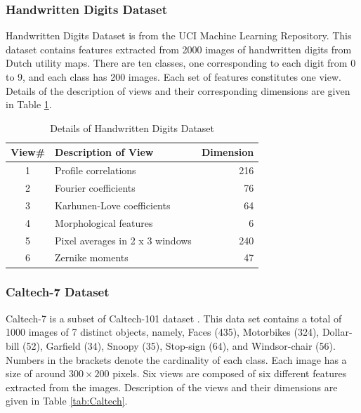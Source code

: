 \subsubsection{Handwritten Digits Dataset}
\hspace{0.8cm}Handwritten Digits Dataset \cite{BlakeM98Digits} is from the UCI Machine Learning Repository. This dataset contains features extracted from 2000 images of handwritten digits from Dutch utility maps. There are ten classes, one corresponding to each digit from 0 to 9, and each class has 200 images. Each set of features constitutes one view. Details of the description of views and their corresponding dimensions are given in Table \ref{tab:Digits}.

\begin{table}[h]
	\centering
	\caption{Details of Handwritten Digits Dataset}
	\label{tab:Digits}
	\begin{tabular}{c l r} \toprule
		
		\textbf{View\#} & \textbf{Description of View} & \textbf{Dimension} \\ \midrule
		1 & Profile correlations & 216 \\ 
		2 & Fourier coefficients & 76 \\ 
		3 & Karhunen-Love coefficients & 64 \\ 
		4 & Morphological features & 6 \\ 
		5 & Pixel averages in 2 x 3 windows & 240 \\ 
		6 & Zernike moments & 47 \\ \bottomrule
		
	\end{tabular}
\end{table}




\subsubsection{Caltech-7 Dataset}
\hspace{0.8cm}Caltech-7 is a subset of Caltech-101 dataset \cite{FeiFP04Caltech}. This data set contains a total of 1000 images of 7 distinct objects, namely, Faces (435), Motorbikes (324), Dollar-bill (52), Garfield (34), Snoopy (35),  Stop-sign (64), and Windsor-chair (56). Numbers in the brackets denote the cardinality of each class. Each image has a size of around $300 \times 200$ pixels. Six views are composed of six different features extracted from the images. Description of the views and their dimensions are given in Table \ref{tab:Caltech}.

